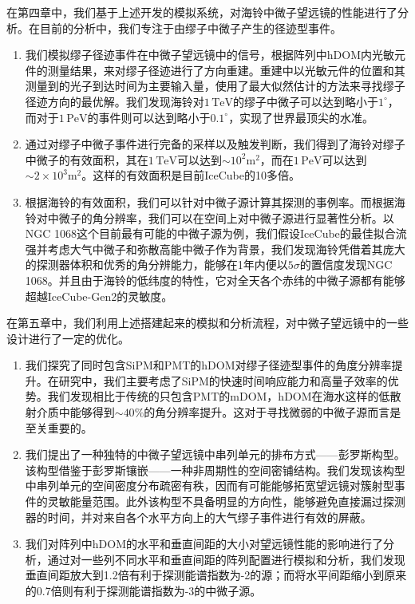 在第四章中，我们基于上述开发的模拟系统，对海铃中微子望远镜的性能进行了分析。在目前的分析中，我们专注于由缪子中微子产生的径迹型事件。
\begin{enumerate}
    \item 我们模拟缪子径迹事件在中微子望远镜中的信号，根据阵列中hDOM内光敏元件的测量结果，来对缪子径迹进行了方向重建。重建中以光敏元件的位置和其测量到的光子到达时间为主要输入量，使用了最大似然估计的方法来寻找缪子径迹方向的最优解。我们发现海铃对$1\,\mathrm{TeV}$的缪子中微子可以达到略小于$1^\circ$，而对于$1\,\mathrm{PeV}$的事件则可以达到略小于$0.1^\circ$，实现了世界最顶尖的水准。
    \item 通过对缪子中微子事件进行完备的采样以及触发判断，我们得到了海铃对缪子中微子的有效面积，其在$1\,\mathrm{TeV}$可以达到$\sim 10^2 \mathrm{m^2}$，而在$1\,\mathrm{PeV}$可以达到$\sim 2 \times 10^3 \mathrm{m^2}$。这样的有效面积是目前IceCube的10多倍。
    \item 根据海铃的有效面积，我们可以针对中微子源计算其探测的事例率。而根据海铃对中微子的角分辨率，我们可以在空间上对中微子源进行显著性分析。以NGC 1068这个目前最有可能的中微子源为例，我们假设IceCube的最佳拟合流强并考虑大气中微子和弥散高能中微子作为背景，我们发现海铃凭借着其庞大的探测器体积和优秀的角分辨能力，能够在1年内便以$5\sigma$的置信度发现NGC 1068。并且由于海铃的低纬度的特性，它对全天各个赤纬的中微子源都有能够超越IceCube-Gen2的灵敏度。
\end{enumerate}

在第五章中，我们利用上述搭建起来的模拟和分析流程，对中微子望远镜中的一些设计进行了一定的优化。
\begin{enumerate}
    \item 我们探究了同时包含SiPM和PMT的hDOM对缪子径迹型事件的角度分辨率提升。在研究中，我们主要考虑了SiPM的快速时间响应能力和高量子效率的优势。我们发现相比于传统的只包含PMT的mDOM，hDOM在海水这样的低散射介质中能够得到$\sim 40\%$的角分辨率提升。这对于寻找微弱的中微子源而言是至关重要的。
    \item 我们提出了一种独特的中微子望远镜中串列单元的排布方式——彭罗斯构型。该构型借鉴于彭罗斯镶嵌——一种非周期性的空间密铺结构。我们发现该构型中串列单元的空间密度分布疏密有秩，因而有可能能够拓宽望远镜对簇射型事件的灵敏能量范围。此外该构型不具备明显的方向性，能够避免直接漏过探测器的时间，并对来自各个水平方向上的大气缪子事件进行有效的屏蔽。
    \item 我们对阵列中hDOM的水平和垂直间距的大小对望远镜性能的影响进行了分析，通过对一些列不同水平和垂直间距的阵列配置进行模拟和分析，我们发现垂直间距放大到1.2倍有利于探测能谱指数为-2的源；而将水平间距缩小到原来的0.7倍则有利于探测能谱指数为-3的中微子源。
\end{enumerate}

